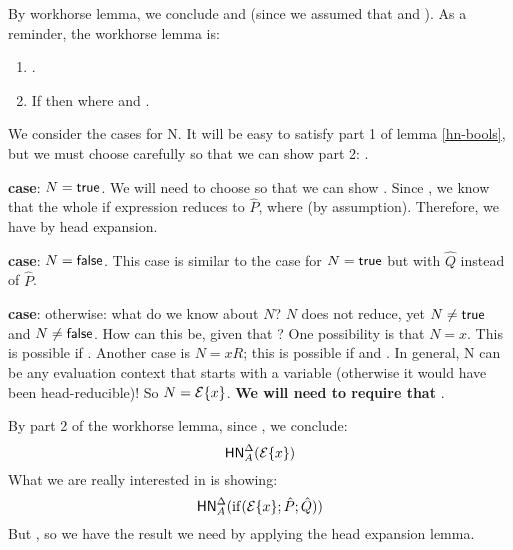 \documentclass{article}
\begin{document}
By workhorse lemma, we conclude  and  (since we assumed that  and ). As a reminder, the workhorse lemma is:

\begin{lemma}\label{lem:workhorse}
\leavevmode %
\begin{enumerate}
\item {}   .
\item If \bnorm{\E} then  where  and .
\end{enumerate}
\end{lemma}

We consider the cases for N. It will be easy to satisfy part 1 of lemma \ref{hn-bools}, but we must choose carefully so that we can show part 2: .

\textbf{case}: $N = \mathsf{true}$. We will need to choose 
so that we can show .
Since , we know that the whole if expression
reduces to $\hat{P}$, where  (by assumption). Therefore, we have  by head expansion.

\textbf{case}: $N = \mathsf{false}$. This case is similar to the case for $N = \mathsf{true}$ but with $\hat Q$ instead of $\hat P$.

\textbf{case}: otherwise: what do we know about $N$? $N$ does not reduce, yet $N \neq \mathsf{true}$ and $N \neq \mathsf{false}$. How can this be, given that ? One possibility is that $N = x$. This is possible if . Another case is $N = x R$; this is possible if  and . In general, N can be any evaluation context that starts with a variable (otherwise it would have been head-reducible)! So $N = \mathcal{E} \{ x \}$. \textbf{We will need to require that \bnorm{\E}}.

By part 2 of the workhorse lemma, since \bnorm{\E}, we conclude:
\[
 \mathsf{HN}^{\Delta}_{A}(\mathcal{E} \{ x \})\\
\]
What we are really interested in is showing:
\[
 \mathsf{HN}^{\Delta}_{A}(\mathrm{if}(\mathcal{E} \{ x \}; \hat P; \hat Q)) \\
\]
But , so we have the result we need by applying the head expansion lemma.
\end{document}
